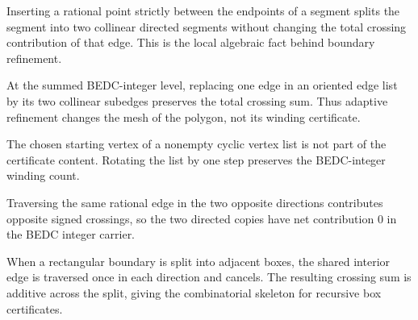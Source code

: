 \begin{principle}
\label{prin:rh-winding-collinear-edge-subdivision}
Inserting a rational point strictly between the endpoints of a segment splits
the segment into two collinear directed segments without changing the total
crossing contribution of that edge. This is the local algebraic fact behind
boundary refinement.
\end{principle}

\begin{principle}
\label{prin:rh-winding-subdivision-invariance}
At the summed BEDC-integer level, replacing one edge in an oriented edge list
by its two collinear subedges preserves the total crossing sum. Thus adaptive
refinement changes the mesh of the polygon, not its winding certificate.
\end{principle}

\begin{principle}
\label{prin:rh-winding-cyclic-rotation}
The chosen starting vertex of a nonempty cyclic vertex list is not part of the
certificate content. Rotating the list by one step preserves the BEDC-integer
winding count.
\end{principle}

\begin{principle}
\label{prin:rh-winding-orientation-cancellation}
Traversing the same rational edge in the two opposite directions contributes
opposite signed crossings, so the two directed copies have net contribution
$0$ in the BEDC integer carrier.
\end{principle}

\begin{principle}
\label{prin:rh-winding-box-split-additivity}
When a rectangular boundary is split into adjacent boxes, the shared interior
edge is traversed once in each direction and cancels. The resulting crossing
sum is additive across the split, giving the combinatorial skeleton for
recursive box certificates.
\end{principle}

